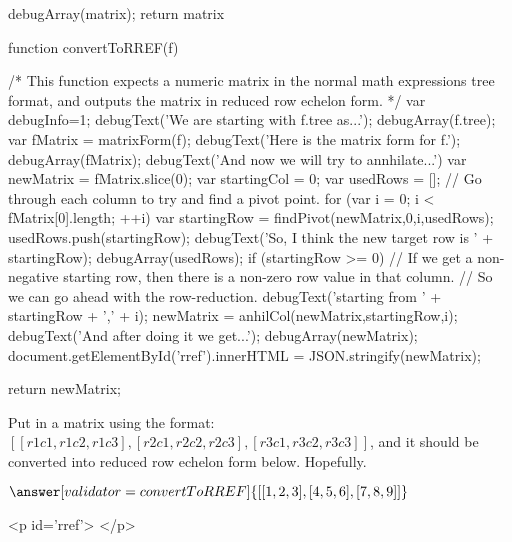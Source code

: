 \documentclass{ximera}
\def\HCode{}
\begin{document}
\begin{javascript}
{    debugArray(matrix);
    return matrix
}


function convertToRREF(f) {
    /*
        This function expects a numeric matrix in the normal math expressions tree format,
        and outputs the matrix in reduced row echelon form.
    */
    var debugInfo=1;
    debugText('We are starting with f.tree as...');
    debugArray(f.tree);
    var fMatrix = matrixForm(f);
    debugText('Here is the matrix form for f.');
    debugArray(fMatrix);
    debugText('And now we will try to annhilate...')
    var newMatrix = fMatrix.slice(0);
    var startingCol = 0;
    var usedRows = [];
    //  Go through each column to try and find a pivot point.
    for (var i = 0; i < fMatrix[0].length; ++i) {
        var startingRow = findPivot(newMatrix,0,i,usedRows);
        usedRows.push(startingRow);
        debugText('So, I think the new target row is ' + startingRow);
        debugArray(usedRows);
        if (startingRow >= 0) {
            // If we get a non-negative starting row, then there is a non-zero row value in that column.
            //  So we can go ahead with the row-reduction.
            debugText('starting from ' + startingRow + ',' + i);
            newMatrix = anhilCol(newMatrix,startingRow,i);
        }
    }
    debugText('And after doing it we get...');
    debugArray(newMatrix); 
    document.getElementById('rref').innerHTML = JSON.stringify(newMatrix);
    
    return newMatrix;   
}

\end{javascript}

\begin{problem}

Put in a matrix using the format: $[ [r1c1,r1c2,r1c3],[r2c1,r2c2,r2c3],[r3c1,r3c2,r3c3] ]$, and it should be converted into reduced row echelon form below. Hopefully.

$\answer[validator=convertToRREF]{[ [1,2,3], [4,5,6], [7,8,9] ]}$


\HCode{<p id='rref'>}
\HCode{</p>}


\end{problem}
\end{document}
